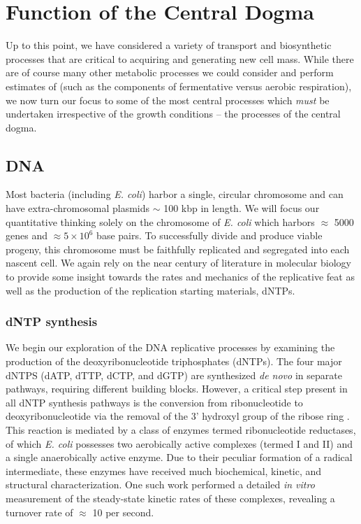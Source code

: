 \section{Function of the Central Dogma}
Up to this point, we have considered a variety of transport and biosynthetic
processes that are critical to acquiring and generating new cell mass. While
there are of course many other metabolic processes we could consider and
perform estimates of (such as the components of fermentative versus aerobic
respiration), we now turn our focus to some of the most central processes
which \textit{must} be undertaken irrespective of the growth conditions --
the processes of the central dogma.


\subsection{DNA}
Most bacteria (including \textit{E. coli}) harbor a single,
circular chromosome and can have extra-chromosomal plasmids $\sim$ 100 kbp in
length. We will focus our quantitative thinking solely on the chromosome of
\textit{E. coli} which harbors $\approx$ 5000 genes and $\approx 5\times
10^6$ base pairs. To successfully divide and produce viable progeny, this chromosome must be faithfully replicated and
segregated into each nascent cell. We again rely on the near century of literature in molecular biology to provide some insight
towards the rates and mechanics of the replicative feat as well as the
production of the replication starting materials, dNTPs.

\subsubsection{dNTP synthesis}
We begin our exploration of the DNA replicative processes by examining the
production of the deoxyribonucleotide triphosphates (dNTPs). The four major
dNTPS (dATP, dTTP, dCTP, and dGTP) are synthesized \textit{de novo} in separate
pathways, requiring different building blocks. However, a critical step present
in all dNTP synthesis pathways is the conversion from ribonucleotide to
deoxyribonucleotide via the removal of the 3' hydroxyl group of the ribose ring
\citep{rudd2016}. This reaction is mediated by a class of enzymes termed ribonucleotide
reductases, of which \textit{E. coli} possesses two aerobically active complexes
(termed I and II) and a single anaerobically active enzyme. Due to their
peculiar formation of a radical intermediate, these enzymes have
received much biochemical, kinetic, and structural characterization.  One such
work \citep{ge2003} performed a detailed \textit{in vitro} measurement of the
steady-state kinetic rates of these complexes, revealing a turnover rate of
$\approx$ 10 per second.

